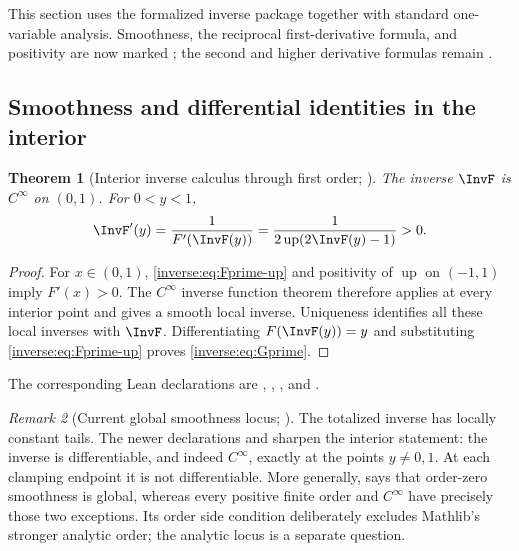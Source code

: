 \documentclass[11pt,oneside]{article}
\newtheorem{theorem}{Theorem}[section]
\theoremstyle{definition}
\theoremstyle{remark}
\newtheorem{remark}[theorem]{Remark}
\newcommand{\Up}{\operatorname{up}}
\begin{document}
This section uses the formalized inverse package together with standard
one-variable analysis.  Smoothness, the reciprocal first-derivative formula,
and positivity are now marked \Formalized; the second and higher derivative
formulas remain \Derived.

\subsection{Smoothness and differential identities in the interior}

\begin{theorem}[Interior inverse calculus through first order; \Formalized]
\label{inverse:thm:inverse-calculus}
The inverse $\InvF$ is $C^\infty$ on $(0,1)$.  For $0<y<1$,
\begin{equation}
 \InvF'(y)
   =\frac1{F'(\InvF(y))}
     =\frac1{2\Up(2\InvF(y)-1)}>0.
 \label{inverse:eq:Gprime}
\end{equation}
\end{theorem}

\begin{proof}
For $x\in(0,1)$, \eqref{inverse:eq:Fprime-up} and positivity of $\Up$ on
$(-1,1)$ imply $F'(x)>0$.  The $C^\infty$ inverse function theorem
therefore applies at every interior point and gives a smooth local inverse.
Uniqueness identifies all these local inverses with $\InvF$.  Differentiating
$F(\InvF(y))=y$ and substituting \eqref{inverse:eq:Fprime-up} proves
\eqref{inverse:eq:Gprime}.
\end{proof}

The corresponding Lean declarations are ,
,
, and
.

\begin{remark}[Current global smoothness locus; \Formalized]
The totalized inverse has locally constant tails.  The newer declarations
 and
 sharpen the interior statement: the
inverse is differentiable, and indeed \(C^\infty\), exactly at the points
\(y\ne0,1\).  At each clamping endpoint it is not differentiable.  More
generally,  says that order-zero smoothness is
global, whereas every positive finite order and \(C^\infty\) have precisely
those two exceptions.  Its order side condition deliberately excludes
Mathlib's stronger analytic order; the analytic locus is a separate question.
\end{remark}
\end{document}
